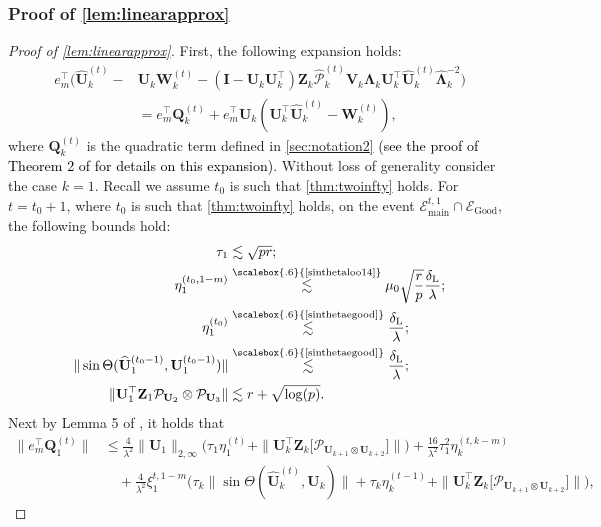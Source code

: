 \documentclass[10pt]{article}
\newcommand{\0}{{\mathbf{0}}}
\newcommand{\1}{{\mathbf{1}}}
\newcommand{\U}{{\mathbf{U}}}
\renewcommand{\citet}{\cite}
\renewcommand{\t}{^{\top}}
\newcommand{\uhat}{\mathbf{\hat{U}}}
\newcommand{\dl}{\delta_{\mathrm{L}}}
\renewcommand{\hat}{\widehat}
\renewcommand{\hat}{\widehat}
\begin{document}
\subsubsection{Proof of \cref{lem:linearapprox}}
\begin{proof}[Proof of \cref{lem:linearapprox}]
First, the following expansion holds:
\begin{align*}
    e_m\t \bigg(\uhat_k^{(t)} - &\U_k \mathbf{W}_k^{(t)}  - (\mathbf{I} - \U_k \U_k\t) \mathbf{Z}_k \mathcal{\hat P}^{(t)}_k \mathbf{V}_k \mathbf{\Lambda}_k \U_k\t \uhat_k^{(t)} \mathbf{\hat{\Lambda}}_k^{-2} \bigg) \\
    &= e_m\t \mathbf{Q}_k^{(t)} + e_m\t \U_k (\U_k\t \uhat_k^{(t)} - \mathbf{W}_k^{(t)}),
\end{align*}
where $\mathbf{Q}_k^{(t)}$ is the quadratic term defined in \cref{sec:notation2} \textcolor{black}{(see the proof of Theorem 2 of \citet{agterberg_estimating_2022} for details on this expansion)}.  
Without loss of generality consider the case $k = 1$.  
Recall we assume $t_0$ is such that \cref{thm:twoinfty} holds.  For $t = t_0 + 1$, where $t_0$ is such that \cref{thm:twoinfty} holds, on the event $\mathcal{E}_{\mathrm{main}}^{t,1} \cap \mathcal{E}_{\mathrm{Good}}$, %
the following bounds hold:
\begin{align*}
    \tau_1 &\lesssim \sqrt{pr}; \\
    \eta_1^{(t_0,1-m)}  &\overset{\scalebox{.6}{\text{\cref{sinthetaloo14}}}}{\lesssim} \mu_0 \sqrt{\frac{r}{p}} \frac{\dl}{\lambda} ;\\
    \eta_1^{(t_0)} &\overset{\scalebox{.6}{\text{\cref{sinthetaegood}}}}{\lesssim} \frac{\dl}{\lambda} ;\\
    \| \sin\Theta(\uhat_1^{(t_0-1)}, \U_1^{(t_0-1)}) \| &\overset{\scalebox{.6}{\text{\cref{sinthetaegood}}}}{\lesssim} \frac{\dl}{\lambda}; \\
    \| \U_1\t \mathbf{Z}_1 \mathcal{P}_{\U_2}\otimes\mathcal{P}_{\U_3} \| &\lesssim r + \sqrt{\log(p)}.
\end{align*}
Next by Lemma 5 of \citet{agterberg_estimating_2022}, it holds that
\begin{align*}
    \| e_m\t \mathbf{Q}_1^{(t)} \| &\leq \frac{4}{\lambda^2} \| \U_1 \|_{2,\infty} \bigg( \tau_1 \eta_1^{(t)} + \| \U_k\t \mathbf{Z}_k\big[ \mathcal{P}_{\U_{k+1} \otimes \U_{k+2}} \big] \| \bigg) + \frac{16}{\lambda^2} \tau_1^2 \eta_k^{(t,k-m)} \\
    &\quad + \frac{4}{\lambda^2} \xi_1^{t,1-m} \bigg( \tau_k \|\sin\Theta(\uhat_k^{(t)}, \U_k) \| + \tau_k \eta_k^{(t-1)} + \| \U_k\t \mathbf{Z}_k \big[ \mathcal{P}_{\U_{k+1} \otimes \U_{k+2}} \big] \| \bigg),

\end{align*}
\end{proof}
\end{document}
